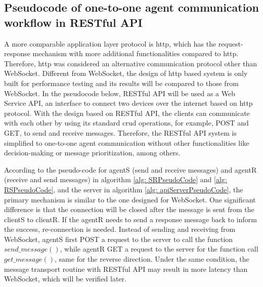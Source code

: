 \subsection{Pseudocode of one-to-one agent communication workflow in RESTful API}\label{chap: Meth-REST-pseudocode}
A more comparable application layer protocol is \gls{http}, which has the request-response mechanism with more additional functionalities compared to \gls{http}. 
Therefore, \gls{http} was considered an alternative communication protocol other 
than WebSocket. 
Different from WebSocket, the design of \gls{http} based system is 
only built for performance testing and its results will be compared to those from 
WebSocket. In the pseudocode 
below, RESTful API will be used as a Web Service API, an interface to connect 
two devices over the internet based on \gls{http} protocol. With the design 
based on RESTful API, the clients can communicate with each other by using its 
standard \gls{crud} operations, for example, POST and GET, to send and receive 
messages. 
Therefore, the RESTful API system is simplified to one-to-one agent communication 
without other functionalities like decision-making or message prioritization, 
among others.


According to the pseudo-code for agentS (send and receive messages) and agentR (receive and send messages) in algorithm \ref{alg: SRPseudoCode} and \ref{alg: RSPseudoCode}, and the server in algorithm \ref{alg: apiServerPseudoCode}, the primary mechanism is similar to the one designed for WebSocket. One significant difference is that the connection will be closed after the message is sent from the clientS to clientR. If the agentR needs to send a response message back to inform the success, re-connection is needed. 
Instead of sending and receiving from WebSocket, agentS first POST a request to the server to call the function $send\_message()$, 
while agentR GET a request to the server for the function call $get\_message()$, same for the reverse direction. 
Under the same condition, the message transport routine with RESTful API may result in more latency than WebSocket, which will be verified later.


